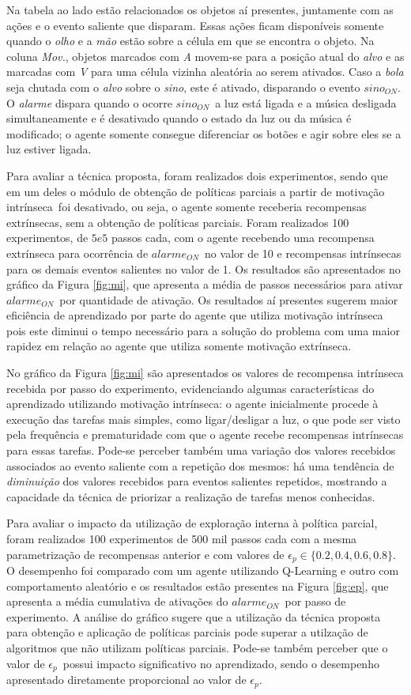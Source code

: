 \documentclass[kdmile,a4paper]{kdmile} %
\newcommand{\tmon}{$alarme_{ON}$}
\newcommand{\beon}{$sino_{ON}$}
\newcommand{\mi}{motivação intrínseca}
\newcommand{\epS}{\epsilon_{p}}
\newcommand{\ep}{$\epS$}
\begin{document}
Na tabela ao lado estão relacionados os objetos aí presentes,
juntamente com as ações e o evento saliente que disparam.  Essas ações
ficam disponíveis somente quando o \emph{olho} e a \emph{mão} estão
sobre a célula em que se encontra o objeto.  Na coluna \emph{Mov.},
objetos marcados com \emph{A} movem-se para a posição atual do
\emph{alvo} e as marcadas com \emph{V} para uma célula vizinha
aleatória ao serem ativados.  Caso a \emph{bola} seja chutada com o
\emph{alvo} sobre o \emph{sino}, este é ativado, disparando o evento
\beon.  O \emph{alarme} dispara quando o ocorre \beon\ a luz está
ligada e a música desligada simultaneamente e é desativado quando o
estado da luz ou da música é modificado; o agente somente consegue
diferenciar os botões e agir sobre eles se a luz estiver ligada.

Para avaliar a técnica proposta, foram realizados dois experimentos,
sendo que em um deles o módulo de obtenção de políticas parciais a
partir de \mi\ foi desativado, ou seja, o agente somente receberia
recompensas extrínsecas, sem a obtenção de políticas parciais.  Foram
realizados 100 experimentos, de $5e5$ passos cada, com o agente
recebendo uma recompensa extrínseca para ocorrência de \tmon\ no valor
de 10 e recompensas intrínsecas para os demais eventos salientes no
valor de 1.  Os resultados são apresentados no gráfico da Figura
\ref{fig:mi}, que apresenta a média de passos necessários para ativar
\tmon\ por quantidade de ativação. Os resultados aí presentes sugerem
maior eficiência de aprendizado por parte do agente que utiliza \mi\,
pois este diminui o tempo necessário para a solução do problema com
uma maior rapidez em relação ao agente que utiliza somente motivação
extrínseca.

No gráfico da Figura \ref{fig:mi} são apresentados os valores de
recompensa intrínseca recebida por passo do experimento, evidenciando
algumas características do aprendizado utilizando \mi : o agente
inicialmente procede à execução das tarefas mais simples, como
ligar/desligar a luz, o que pode ser visto pela frequência e
prematuridade com que o agente recebe recompensas intrínsecas para
essas tarefas. Pode-se perceber também uma variação dos valores
recebidos associados ao evento saliente com a repetição dos mesmos: há
uma tendência de \emph{diminuição} dos valores recebidos para eventos
salientes repetidos, mostrando a capacidade da técnica de priorizar a
realização de tarefas menos conhecidas.

Para avaliar o impacto da utilização de exploração interna à política
parcial, foram realizados 100 experimentos de 500 mil passos cada com
a mesma parametrização de recompensas anterior e com valores de $\epS
\in \{0.2, 0.4, 0.6, 0.8\}$.  O desempenho foi comparado com um agente
utilizando Q-Learning e outro com comportamento aleatório e os
resultados estão presentes na Figura \ref{fig:ep}, que apresenta a
média cumulativa de ativações do \tmon\ por passo de experimento.  A
análise do gráfico sugere que a utilização da técnica proposta para
obtenção e aplicação de políticas parciais pode superar a utilzação de
algoritmos que não utilizam políticas parciais.  Pode-se também
perceber que o valor de \ep\ possui impacto significativo no
aprendizado, sendo o desempenho apresentado diretamente proporcional
ao valor de \ep.
\end{document}
